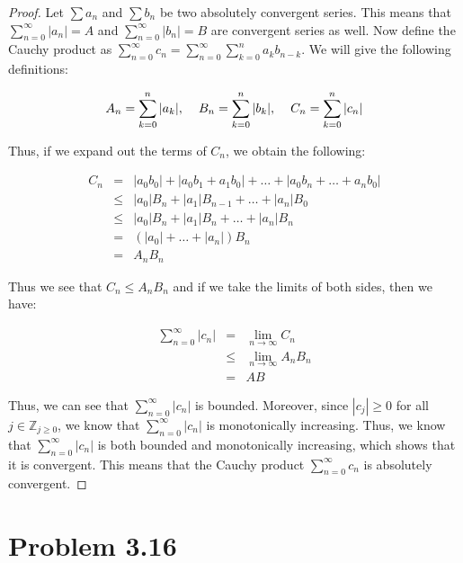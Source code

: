 \documentclass[psamsfonts]{amsart}
\theoremstyle{definition}
\theoremstyle{remark}
\numberwithin{equation}{section}
\begin{document}
\begin{proof}
Let $\sum a_n$ and $\sum b_n$ be two absolutely convergent series. This means that $\sum_{n=0}^{\infty} |a_n| = A$ and $\sum_{n=0}^{\infty} |b_n| = B$ are convergent series as well. Now define the Cauchy product as $\sum_{n=0}^{\infty} c_n = \sum_{n=0}^{\infty} \sum_{k=0}^{n} a_k b_{n-k}$. We will give the following definitions:

\begin{equation}
A_n = \sum_{k=0}^{n} |a_k|, \hspace{0.4cm} B_n = \sum_{k=0}^{n} |b_k|, \hspace{0.4cm} C_n = \sum_{k=0}^{n} |c_n|
\end{equation}

Thus, if we expand out the terms of $C_n$, we obtain the following:

\begin{eqnarray}
C_n &=& |a_0 b_0| + |a_0 b_1 + a_1 b_0| + \ldots + | a_0 b_n + \ldots + a_n b_0 | \\
&\leq& |a_0| B_n + |a_1| B_{n-1} + \ldots + | a_n| B_0 \\
&\leq& |a_0| B_n + |a_1| B_n + \ldots + |a_n| B_n \\
&=& (|a_0| + \ldots + |a_n|) B_n \\
&=& A_n B_n 
\end{eqnarray}

Thus we see that $C_n \leq A_n B_n$ and if we take the limits of both sides, then we have:

\begin{eqnarray}
\sum_{n=0}^{\infty} |c_n | &=& \lim_{n \to \infty} C_n \\
&\leq& \lim_{n \to \infty} A_n B_n \\
&=& AB
\end{eqnarray}

Thus, we can see that $\sum_{n=0}^{\infty} |c_n| $ is bounded. Moreover, since $|c_j| \geq 0$ for all $j \in \mathbb{Z}_{j \geq 0}$, we know that $\sum_{n=0}^{\infty} |c_n|$ is monotonically increasing. Thus, we know that $\sum_{n=0}^{\infty} |c_n|$ is both bounded and monotonically increasing, which shows that it is convergent. This means that the Cauchy product $\sum_{n=0}^{\infty} c_n$ is absolutely convergent. 

\end{proof}

\section{Problem 3.16}
\end{document}
